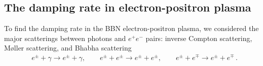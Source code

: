 


\subsection{The damping rate in electron-positron plasma}\label{sec:relax}
To find the damping rate in the BBN electron-positron plasma, we considered the major scatterings between photons and $e^+e^-$ pairs: inverse Compton scattering, M{\o}ller scattering, and Bhabha scattering
\begin{align}
&e^\pm+\gamma\longrightarrow e^\pm+\gamma,\qquad e^\pm+e^\pm\longrightarrow e^\pm+e^\pm,\qquad e^\pm+e^\mp\longrightarrow e^\pm+e^\mp\,.
\end{align}

